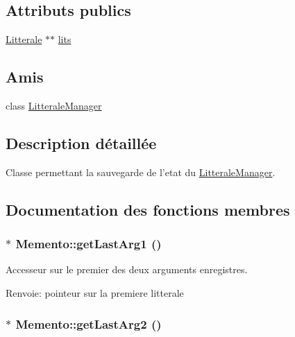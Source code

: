 \subsection*{Attributs publics}
\begin{CompactItemize}
\item 
\hyperlink{class_litterale}{Litterale} $\ast$$\ast$ \hyperlink{class_memento_0294c5bd7e564cd5614911979e65b35d}{lits}
\end{CompactItemize}
\subsection*{Amis}
\begin{CompactItemize}
\item 
\hypertarget{class_memento_0aab3199db1ebeb99e33e66b9cf8e975}{
class \hyperlink{class_memento_0aab3199db1ebeb99e33e66b9cf8e975}{LitteraleManager}}
\label{class_memento_0aab3199db1ebeb99e33e66b9cf8e975}

\end{CompactItemize}


\subsection{Description détaillée}
Classe permettant la sauvegarde de l'etat du \hyperlink{class_litterale_manager}{LitteraleManager}. 

\subsection{Documentation des fonctions membres}
\hypertarget{class_memento_a30492b498231a10ba8b546e72ee0540}{
\subsubsection[{getLastArg1}]{$\ast$ Memento::getLastArg1 ()}}
\label{class_memento_a30492b498231a10ba8b546e72ee0540}


Accesseur sur le premier des deux arguments enregistres. 

\begin{Desc}
\item[Renvoie:]pointeur sur la premiere litterale \end{Desc}
\hypertarget{class_memento_3e41b8b940d028d9c35d7f2c26395144}{
\subsubsection[{getLastArg2}]{$\ast$ Memento::getLastArg2 ()}}
\label{class_memento_3e41b8b940d028d9c35d7f2c26395144}


